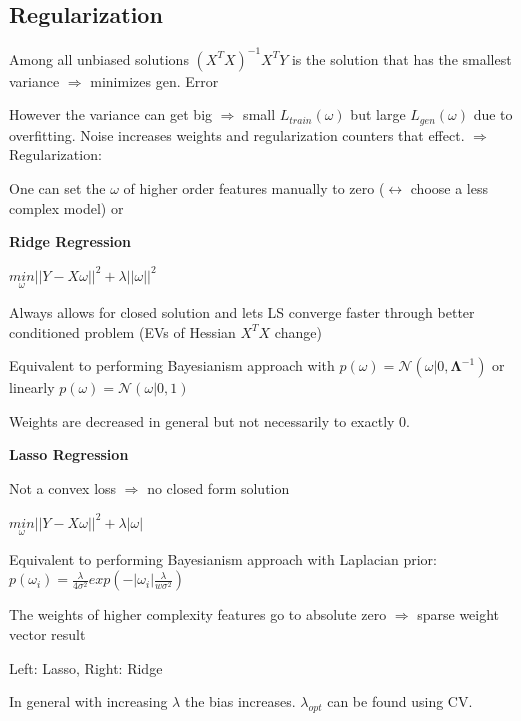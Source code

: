 \subsection{Regularization}

Among all unbiased solutions $(X^TX)^{-1}X^TY$ is the solution that has the smallest variance $\Rightarrow$ minimizes gen. Error

However the variance can get big $\Rightarrow$ small $L_{train}(\omega)$ but large $L_{gen}(\omega)$ due to overfitting. Noise increases weights and regularization counters that effect. $\Rightarrow$ Regularization:

One can set the $\omega$ of higher order features manually to zero ($\leftrightarrow$ choose a less complex model) or

\textbf{Ridge Regression}

$\underset{\omega}{min}||Y-X\omega||^2 + \lambda||\omega||^2$

Always allows for closed solution and lets LS converge faster through better conditioned problem (EVs of Hessian $X^TX$ change)

Equivalent to performing Bayesianism approach with $p(\omega) = \mathcal{N}(\omega|0,\boldsymbol{\Lambda}^{-1})$ or linearly $p(\omega) = \mathcal{N}(\omega|0,1)$

Weights are decreased in general but not necessarily to exactly 0.

\textbf{Lasso Regression}

Not a convex loss $\Rightarrow$ no closed form solution

$\underset{\omega}{min}||Y-X\omega||^2 + \lambda|\omega|$

Equivalent to performing Bayesianism approach with Laplacian prior:  $p(\omega_i) = \frac{\lambda}{4\sigma^2}exp(-|\omega_i|\frac{\lambda}{w\sigma^2})$

The weights of higher complexity features go to absolute zero $\Rightarrow$ sparse weight vector result

\begin{center}
\end{center}
Left: Lasso, Right: Ridge

In general with increasing $\lambda$ the bias increases. $\lambda_{opt}$ can be found using CV.
